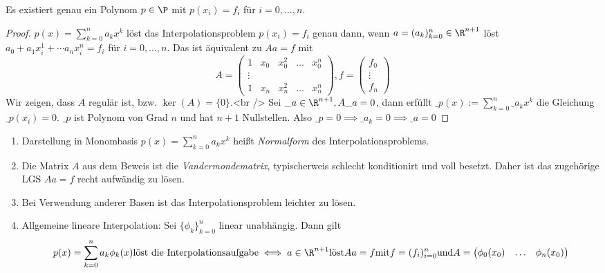 \documentclass[a4paper,11pt]{scrartcl}
\begin{document}
\begin{st}
	\label{1.1}
	Es existiert genau ein Polynom $p\in \P$ mit $p(x_i)=f_i$ für $i=0,\dotsc,n$.
	\begin{proof}
		$p(x) = \sum_{k=0}^n a_k x^k$ löst das Interpolationsproblem $p(x_i)=f_i$ genau dann, wenn $a=(a_k)_{k=0}^n \in \R^{n+1}$ löst $a_0 +a_1x_i^1 + \dotsb a_nx_i^n = f_i$ für $i=0,\dotsc,n$.
		Das ist äquivalent zu $Aa=f$ mit
		\[
		A= \begin{pmatrix} 1 & x_0 & x_0^2 & \hdots & x_0^n \\
		\vdots  \\
		1 & x_n & x_n^2 & \hdots & x_n^n\end{pmatrix}, f= \begin{pmatrix}f_0 \\ \vdots \\ f_n\end{pmatrix}
		\]
		Wir zeigen, dass $A$ regulär ist, bzw. $\ker(A) = \{0\}$.<br />
		Sei $\_a \in \R^{n+1}, A\_a=0$, dann erfüllt
		$\_p(x) := \sum_{k=0}^n\_a_k x^k$ die Gleichung $\_p(x_i)=0$.
		$\_p$ ist Polynom von Grad $n$ und hat $n+1$ Nullstellen. Also $\_p=0 \implies \_a_k=0 \implies \_a=0$
	\end{proof}
	\begin{note}
		\begin{enumerate}
			\item 
				Darstellung in Monombasis $p(x)= \sum_{k=0}^n a_kx^k$ heißt \emph{Normalform} des Interpolationsproblems.
			\item
				Die Matrix $A$ aus dem Beweis ist die \emph{Vandermondematrix}, typischerweis schlecht konditionirt und voll besetzt.
				Daher ist das zugehörige LGS $Aa=f$ recht aufwändig zu lösen.
			\item
				Bei Verwendung anderer Basen ist das Interpolationsproblem leichter zu lösen.
			\item
				Allgemeine lineare Interpolation:
				Sei $\{\phi_k\}_{k=0}^n$ linear unabhängig. Dann gilt
				\begin{align*}
					p(x) = \sum_{k=0}^n a_k \phi_k(x) \text{löst die Interpolationsaufgabe}
					\iff a\in \R^{n+1} \text{löst} Aa=f \text{mit} f=(f_i)_{i=0}^n \text{und} A= \begin{pmatrix}\phi_0(x_0) & \hdots & \phi_n(x_0)\\
					\end{pmatrix}
				\end{align*}
		\end{enumerate}
		
	\end{note}
\end{st}
\end{document}
